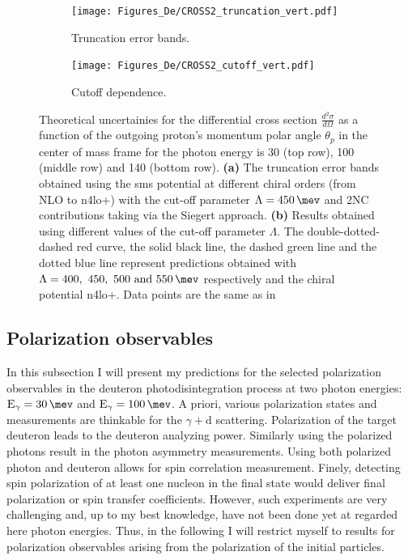         
    \begin{figure}[h]
        \centering
        \begin{subfigure}[t]{0.46\textwidth}
            \caption{Truncation error bands.}
            \texttt{[image: Figures\_De/CROSS2\_truncation\_vert.pdf]}
            \label{Diff_cross_truncation}
        \end{subfigure}
        \begin{subfigure}[t]{0.46\textwidth}
            \caption{Cutoff dependence.}
            \texttt{[image: Figures\_De/CROSS2\_cutoff\_vert.pdf]}
            \label{Diff_cross_cutoff}
        \end{subfigure}
        \caption{Theoretical uncertainies 
        for the differential cross section $\frac{d^2\sigma}{d\Omega}$
        as a function of the outgoing proton's momentum polar angle $\theta_p$ in the center of mass frame 
        for the photon energy is \SI{30}{\mev} (top row), \SI{100}{\mev} (middle row) and \SI{140}{\mev} (bottom row).
        {\bf(a)} The truncation error bands obtained using the \gls{sms} potential
        at different chiral orders (from NLO to \gls{n4lo+}) 
        with the cut-off parameter $\Lambda=\SI{450}{\mev}$ and 2NC contributions taking via the Siegert approach.
        {\bf (b)} Results obtained using different values of the cut-off parameter $\Lambda$.
        The double-dotted-dashed red curve, the solid black line, the dashed green line
        and the dotted blue line represent predictions obtained 
        with $\Lambda=\SIlist[list-units = single]{400;450;500;550}{\mev}$ respectively
        and the chiral potential \gls{n4lo+}. 
        Data points are the same as in }
        \label{Diff_cross_err}
    \end{figure}

    \clearpage

    \subsection{Polarization observables}
    \label{sec:polarization_results}

    In this subsection I will present my predictions for the 
    selected polarization observables in the deuteron photodisintegration process
    at two photon energies: $\text{E}_\gamma = \SI{30}{\mev}$ and
    $\text{E}_\gamma = \SI{100}{\mev}$.
    A priori, various polarization states and measurements
    are thinkable for the $\gamma + \text{d}$ scattering.
    Polarization of the target deuteron leads to the deuteron
    analyzing power.
    Similarly using the polarized photons result in the photon asymmetry measurements.
    Using both polarized photon and deuteron allows for spin
    correlation measurement.
    Finely, detecting spin polarization of at least one nucleon in the final state would deliver
    final polarization or spin transfer coefficients. 
    However, such experiments are very challenging and, up to my best knowledge,
    have not been done yet at regarded here photon energies.
    Thus, in the following I will restrict myself to results for polarization
    observables arising from the polarization of the initial particles.

